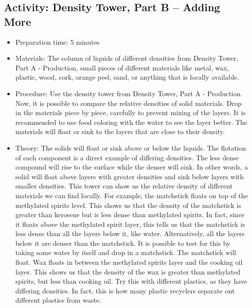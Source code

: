 \begin{itemize}
{\begin{itemize}
\subsection{Activity: Density Tower, Part B – Adding More}
\begin{itemize}
\item{Preparation time: 5 minutes}
\item{Materials: The column of liquids of different densities from Density Tower, Part A - Production, small pieces of different materials like metal, wax, plastic, wood, cork, orange peel, sand, or anything that is locally available.}
\item{Procedure: Use the density tower from Density Tower, Part A - Production. Now, it is possible to compare the relative densities of solid materials. Drop in the materials piece by piece, carefully to prevent mixing of the layers. It is recommended to use food coloring with the water to see the layer better. The materials will float or sink to the layers that are close to their density.  }
\item{Theory: The solids will float or sink above or below the liquids. The flotation of each component is a direct example of differing densities. The less dense compound will rise to the surface while the denser will sink. In other words, a solid will float above layers with greater densities and sink below layers with smaller densities. This tower can show us the relative density of different materials we can find locally. For example, the matchstick floats on top of the methylated spirits level. This shows us that the density of the matchstick is greater than kerosene but is less dense than methylated spirits. In fact, since it floats above the methylated spirit layer, this tells us that the matchstick is less dense than all the layers below it, like water. Alternatively, all the layers below it are denser than the matchstick. It is possible to test for this by taking some water by itself and drop in a matchstick. The matchstick will float. Wax floats in between the methylated spirits layer and the cooking oil layer. This shows us that the density of the wax is greater than methylated spirits, but less than cooking oil. Try this with different plastics, as they have differing densities. In fact, this is how many plastic recyclers separate out different plastics from waste.}
\end{itemize}


\end{itemize}}
\end{itemize}
